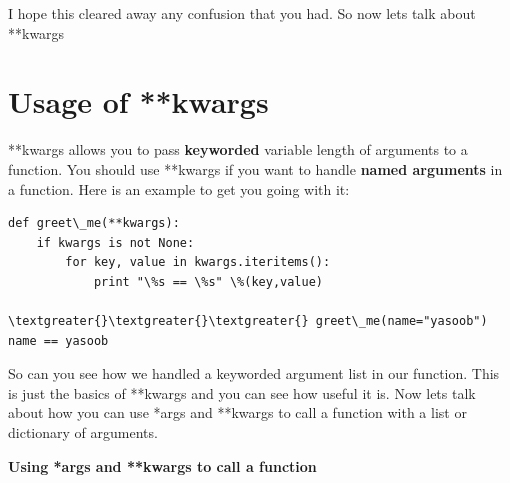 \documentclass[a4paper,12pt,oneside]{sphinxmanual}
\begin{document}
I hope this cleared away any confusion that you had. So now lets talk
about **kwargs


\section{Usage of **kwargs}
\label{args_and_kwargs:usage-of-kwargs}
**kwargs allows you to pass \textbf{keyworded} variable length of arguments
to a function. You should use **kwargs if you want to handle \textbf{named
arguments} in a function. Here is an example to get you going with it:
\begin{Verbatim}[commandchars=\\\{\}]
def greet\_me(**kwargs):
    if kwargs is not None:
        for key, value in kwargs.iteritems():
            print "\%s == \%s" \%(key,value)

\textgreater{}\textgreater{}\textgreater{} greet\_me(name="yasoob")
name == yasoob
\end{Verbatim}

So can you see how we handled a keyworded argument list in our function.
This is just the basics of **kwargs and you can see how useful it is.
Now lets talk about how you can use *args and **kwargs to call a
function with a list or dictionary of arguments.

\textbf{Using *args and **kwargs to call a function}
\end{document}
